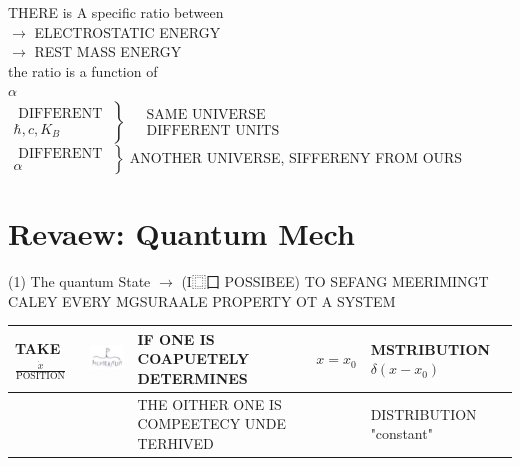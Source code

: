 \documentclass[10pt]{article}
\begin{document}
THERE is A specific ratio between\\
$\rightarrow$ ELECTROSTATIC ENERGY\\
$\rightarrow$ REST MASS ENERGY\\
the ratio is a function of\\
$\alpha$\\
$\left.\begin{array}{l}\text { DIFFERENT } \\ \hbar, c, K_{B}\end{array}\right\} \begin{aligned} & \text { SAME UNIVERSE } \\ & \text { DIFFERENT UNITS }\end{aligned}$\\
$\left.\begin{array}{c}\text { DIFFERENT } \\ \alpha\end{array}\right\}$ ANOTHER UNIVERSE, SIFFERENY FROM OURS

\section*{Revaew: Quantum Mech}
(1) The quantum State $\rightarrow$ (I⿴囗 POSSIBEE) TO SEFANG MEERIMINGT CALEY EVERY MGSURAALE PROPERTY OT A SYSTEM

\begin{center}
\begin{tabular}{|l|l|l|l|l|}
\hline
TAKE $\frac{\dot{x}}{\operatorname{POSITION}}$ & \includegraphics[max width=\textwidth]{2025_10_16_f02af6fa434c9f0bcc00g-03}
 & IF ONE IS COAPUETELY DETERMINES & $x=x_{0}$ & MSTRIBUTION $\delta\left(x-x_{0}\right)$ \\
\hline
 &  & THE OITHER ONE IS COMPEETECY UNDE TERHIVED &  & DISTRIBUTION "constant" \\
\hline
\end{tabular}
\end{center}
\end{document}
